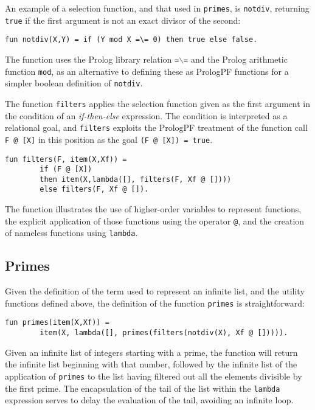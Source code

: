 An example of a selection function, and that used in \texttt{primes}, is
\texttt{notdiv}, returning \texttt{true} if the first argument is not an exact
divisor of the second:
\begin{verbatim}
fun notdiv(X,Y) = if (Y mod X =\= 0) then true else false.
\end{verbatim}
The function uses the Prolog library relation \texttt{=$\backslash$=} and the
Prolog arithmetic function \texttt{mod}, as an alternative to defining these as
PrologPF functions for a simpler boolean definition of \texttt{notdiv}.

The function \texttt{filters} applies the selection function given as the first 
argument in the condition of an \textit{if-then-else} expression.  The condition is
interpreted as a relational goal, and \texttt{filters} exploits the
PrologPF treatment of the function call \texttt{F @ [X]} in this position as the goal
\texttt{(F @ [X]) = true}.
\begin{verbatim}
fun filters(F, item(X,Xf)) =
        if (F @ [X])
        then item(X,lambda([], filters(F, Xf @ [])))
        else filters(F, Xf @ []).
\end{verbatim}
The function illustrates the use of higher-order variables to represent functions,
the explicit application of those functions using the operator \texttt{@}, and
the creation of nameless functions using \texttt{lambda}.

\subsection{Primes}

Given the definition of the term used to represent an infinite list, and the
utility functions defined above, the definition of the function \texttt{primes}
is straightforward:
\begin{verbatim}
fun primes(item(X,Xf)) =
        item(X, lambda([], primes(filters(notdiv(X), Xf @ [])))).
\end{verbatim}
Given an infinite list of integers starting with a prime, the function will return
the infinite list beginning with that number, followed by the infinite list of
the application of \texttt{primes} to the list having filtered out all the elements
divisible by the first prime.  The encapsulation of the tail of the list within
the \texttt{lambda} expression serves to delay the evaluation of the tail, avoiding
an infinite loop.

